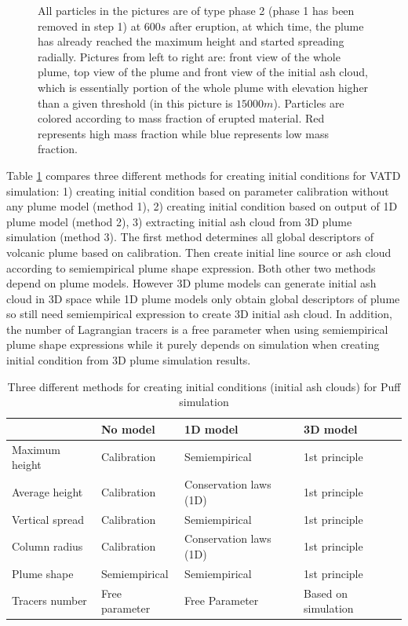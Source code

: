 \documentclass[draft,linenumbers]{agujournal2019}
\begin{document}
\begin{figure}[!htb]
\begin{minipage}{.325 \textwidth}
    \end{minipage}%
    \caption{All particles in the pictures are of type phase 2 (phase 1 has been removed in step 1) at $600s$ after eruption, at which time, the plume has already reached the maximum height and started spreading radially. Pictures from left to right are: front view of the whole plume, top view of the plume and front view of the initial ash cloud, which is essentially portion of the whole plume with elevation higher than a given threshold (in this picture is $15000 m$). Particles are colored according to mass fraction of erupted material. Red represents high mass fraction while blue represents low mass fraction.}
    \label{fig:Plume-SPH-Pinatubo-ash-cloud}
\end{figure}

Table \ref{tab:VATDs-source-term-determination} compares three different methods for creating initial conditions for VATD simulation: 1) creating initial condition based on parameter calibration without any plume model (method 1), 2) creating initial condition based on output of 1D plume model (method 2), 3) extracting initial ash cloud from 3D plume simulation (method 3). The first method determines all global descriptors of volcanic plume based on calibration. Then create initial line source or ash cloud according to semiempirical plume shape expression. Both other two methods depend on plume models. However 3D plume models can generate initial ash cloud in 3D space while 1D plume models only obtain global descriptors of plume so still need semiempirical expression to create 3D initial ash cloud. In addition, the number of Lagrangian tracers is a free parameter when using semiempirical plume shape expressions while it purely depends on simulation when creating initial condition from 3D plume simulation results.

\begin{table}
\centering
      \caption{Three different methods for creating initial conditions (initial ash clouds) for Puff simulation}		
	  \begin{tabular}{p{26.5mm}p{25.5mm}p{36.5mm}p{34.5mm}}
	    \hline
	    		 & No model & 1D model & 3D model \\
	    		 \hline    		 
	  Maximum height & Calibration & Semiempirical &  1st principle \\
	  Average height &  Calibration & Conservation laws (1D) &  1st principle  \\
	  Vertical spread &  Calibration & Semiempirical & 1st principle \\
	  Column radius & Calibration  &  Conservation laws (1D) &  1st principle \\
	  Plume shape & Semiempirical & Semiempirical  & 1st principle \\
	  Tracers number & Free parameter  & Free Parameter & Based on simulation\\ 
	    \hline
	  \end{tabular}
	  \label{tab:VATDs-source-term-determination}
\end{table}
\end{document}
